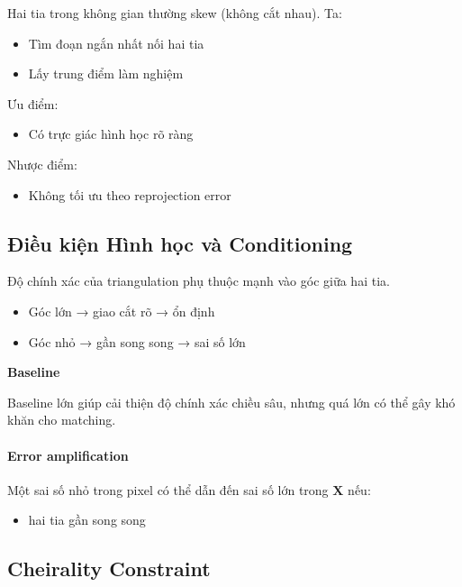 Hai tia trong không gian thường skew (không cắt nhau). Ta:

\begin{itemize}
	\item Tìm đoạn ngắn nhất nối hai tia
	\item Lấy trung điểm làm nghiệm
\end{itemize}

Ưu điểm:
\begin{itemize}
	\item Có trực giác hình học rõ ràng
\end{itemize}

Nhược điểm:
\begin{itemize}
	\item Không tối ưu theo reprojection error
\end{itemize}

\subsection{Điều kiện Hình học và Conditioning}
\label{subsec:conditioning}

Độ chính xác của triangulation phụ thuộc mạnh vào góc giữa hai tia.

\begin{itemize}
	\item Góc lớn → giao cắt rõ → ổn định
	\item Góc nhỏ → gần song song → sai số lớn
\end{itemize}

\begin{mdframed}[style=infobox]
	\textbf{Baseline}
	
	Baseline lớn giúp cải thiện độ chính xác chiều sâu, nhưng quá lớn có thể gây khó khăn cho matching.
\end{mdframed}

\paragraph{Error amplification}

Một sai số nhỏ trong pixel có thể dẫn đến sai số lớn trong $\mathbf{X}$ nếu:
\begin{itemize}
	\item hai tia gần song song
\end{itemize}

\subsection{Cheirality Constraint}
\label{subsec:cheirality}

